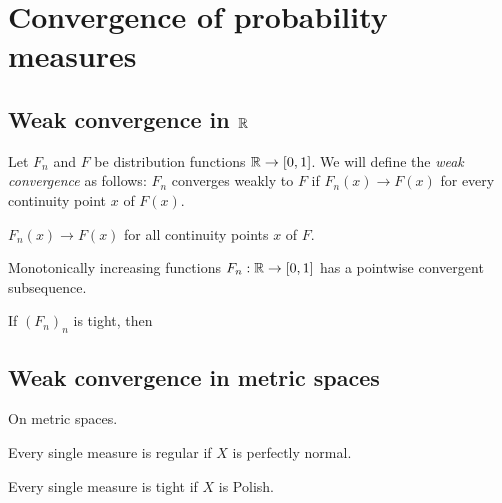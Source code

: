 \documentclass{../note}
\begin{document}
\chapter{Convergence of probability measures}


\section{Weak convergence in $\mathbb{R}$}
\begin{prb}
Let $F_n$ and $F$ be distribution functions $\mathbb{R}\to[0,1]$.
We will define the \emph{weak convergence} as follows: $F_n$ converges weakly to $F$ if $F_n(x)\to F(x)$ for every continuity point $x$ of $F(x)$.
\begin{parts}
\item $F_n(x)\to F(x)$ for all continuity points $x$ of $F$.
\end{parts}
\end{prb}

\begin{prb}
\end{prb}

\begin{prb}
\end{prb}

\begin{prb}
\end{prb}

\begin{prb}
\begin{parts}
\item Monotonically increasing functions $F_n:\mathbb{R}\to[0,1]$ has a pointwise convergent subsequence.
\item If $(F_n)_n$ is tight, then
\end{parts}
\end{prb}




\section{Weak convergence in metric spaces}

\begin{prb}
On metric spaces.
\begin{parts}
\item Every single measure is regular if $X$ is perfectly normal.
\item Every single measure is tight if $X$ is Polish.
\end{parts}
\end{prb}
\end{document}
